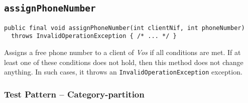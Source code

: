 %
%
%
\subsection{\texttt{assignPhoneNumber}}
\label{sec:methods.assignPhoneNumber}
\begin{verbatim}
public final void assignPhoneNumber(int clientNif, int phoneNumber)
  throws InvalidOperationException { /* ... */ }
\end{verbatim}

Assigns a free phone number to a client of \textit{Vos} if all conditions are
met. If at least one of these conditions does not hold, then this method does
not change anything. In such cases, it throws an
\texttt{InvalidOperationException} exception.

\subsubsection{Test Pattern -- Category-partition}
\label{sec:methods.assignPhoneNumber.pattern}

